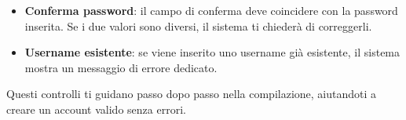\begin{itemize}[itemsep=5pt, parsep=5pt, label=$\scriptstyle\bullet$]
	\item \textbf{Conferma password}: il campo di conferma deve coincidere con la password inserita. Se i due valori sono diversi, il sistema ti chieder\`a di correggerli.
\end{itemize}

\begin{itemize}[itemsep=5pt, parsep=5pt, label=$\scriptstyle\bullet$]
	\item \textbf{Username esistente}: se viene inserito uno username gi\`a esistente, il sistema mostra un messaggio di errore dedicato.
\end{itemize}

Questi controlli ti guidano passo dopo passo nella compilazione, aiutandoti a creare un account valido senza errori.
